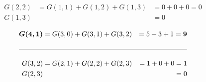 \documentclass{article}
\begin{document}
{\begin{equation*}
\begin{aligned}
            G(2,2)  &=  G(1,1)+G(1,2)+G(1,3)        &=0+0+0=0\\
            G(1,3)  &&= 0\\
        \end{aligned}
    \end{equation*}
    \begin{equation*}
        \begin{aligned}
            \boldsymbol{G(4,1)} &=  G(3,0)+G(3,1)+G(3,2)       &=5+3+1=\boldsymbol{9}\\
            \\\hline\\
            G(3,2)  &=  G(2,1)+G(2,2)+G(2,3)                    &=1+0+0=1\\
            G(2,3)  &&= 0\\
        \end{aligned}
    \end{equation*}
    }
\end{document}
